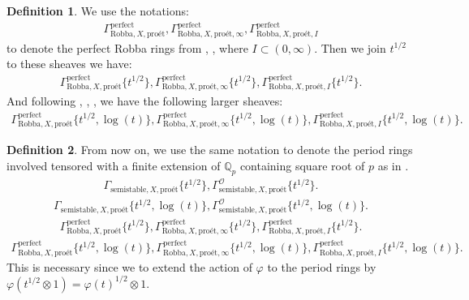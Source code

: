 \documentclass[12pt]{book}
\theoremstyle{definition}
\newtheorem{definition}{Definition}
\begin{document}
\begin{definition}
We use the notations:
\begin{align}
\Gamma^\mathrm{perfect}_{\text{Robba},X,\text{pro\'et}},\Gamma^\mathrm{perfect}_{\text{Robba},X,\text{pro\'et},\infty},\Gamma^\mathrm{perfect}_{\text{Robba},X,\text{pro\'et},I}
\end{align}
to denote the perfect Robba rings from \cite{KL1}, \cite{KL2}, where $I\subset (0,\infty)$. Then we join $t^{1/2}$ to these sheaves we have:
\begin{align}
\Gamma^\mathrm{perfect}_{\text{Robba},X,\text{pro\'et}}\{t^{1/2}\},\Gamma^\mathrm{perfect}_{\text{Robba},X,\text{pro\'et},\infty}\{t^{1/2}\},\Gamma^\mathrm{perfect}_{\text{Robba},X,\text{pro\'et},I}\{t^{1/2}\}.
\end{align}
And following \cite{BL1}, \cite{BL2}, \cite{Fon1}, \cite{BHS} we have the following larger sheaves:
\begin{align}
\Gamma^\mathrm{perfect}_{\text{Robba},X,\text{pro\'et}}\{t^{1/2},\log(t)\},\Gamma^\mathrm{perfect}_{\text{Robba},X,\text{pro\'et},\infty}\{t^{1/2},\log(t)\},\Gamma^\mathrm{perfect}_{\text{Robba},X,\text{pro\'et},I}\{t^{1/2},\log(t)\}.
\end{align} 
\end{definition}



\begin{definition}
From now on, we use the same notation to denote the period rings involved tensored with a finite extension of $\mathbb{Q}_p$ containing square root of $p$ as in \cite{BS}.
\begin{align}
\Gamma_{\text{semistable},X,\text{pro\'et}}\{t^{1/2}\},\Gamma^\mathcal{O}_{\text{semistable},X,\text{pro\'et}}\{t^{1/2}\}.
\end{align}
\begin{align}
\Gamma_{\text{semistable},X,\text{pro\'et}}\{t^{1/2},\log(t)\},\Gamma^\mathcal{O}_{\text{semistable},X,\text{pro\'et}}\{t^{1/2},\log(t)\}.
\end{align}
\begin{align}
\Gamma^\mathrm{perfect}_{\text{Robba},X,\text{pro\'et}}\{t^{1/2}\},\Gamma^\mathrm{perfect}_{\text{Robba},X,\text{pro\'et},\infty}\{t^{1/2}\},\Gamma^\mathrm{perfect}_{\text{Robba},X,\text{pro\'et},I}\{t^{1/2}\}.
\end{align}
\begin{align}
\Gamma^\mathrm{perfect}_{\text{Robba},X,\text{pro\'et}}\{t^{1/2},\log(t)\},\Gamma^\mathrm{perfect}_{\text{Robba},X,\text{pro\'et},\infty}\{t^{1/2},\log(t)\},\Gamma^\mathrm{perfect}_{\text{Robba},X,\text{pro\'et},I}\{t^{1/2},\log(t)\}.
\end{align}
This is necessary since we to extend the action of $\varphi$ to the period rings by $\varphi(t^{1/2}\otimes 1)=\varphi(t)^{1/2}\otimes 1$.
\end{definition}
\end{document}
